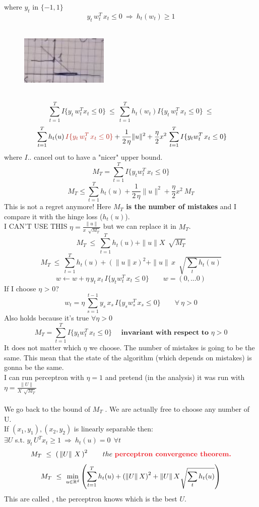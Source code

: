 \documentclass[../main.tex]{subfiles}
\begin{document}
where $y_t$ in $\{ -1,1\}$
$$
y_t \, w_t^T \, x_t \leq 0 \ \Rightarrow \ h_t(w_t) \geq 1
$$
\\
\begin{figure}[h]
    \centering
    \includegraphics[width=0.4\linewidth]{../img/lez16-img3.JPG}
    \caption{}
\end{figure}\\
$$
\sum_{t=1}^T I \{y_t \, w_t^T x_t \leq 0  \} \ \leq \ \sum_{t=1}^T h_t(w_t) I \{y_t \, w_t^T \, x_t \leq 0 \} \ \leq 
$$
$$
\ \sum_{t=1}^T h_t(u ) \, \red{I \{ y_t \, w_t^T \, x_t \leq 0 \}} + \frac{1}{2 \, \eta} \| u \|^2 + \frac{\eta}{2} x^2 \, \sum_{t=1}^T I\{y_t w_t^T \, x_t \leq 0 \}
$$
where $I{..}$ cancel out to have a "nicer" upper bound.
$$
M_T = \sum_{t=1}^T  I\{y_t w_t^T \, x_t \leq 0 \}
$$
$$
M_T \leq \sum_{t=1}^T h_t(u) + \frac{1}{2 \, \eta} \|u \|^2 + \frac{\eta}{2} x^2 \ M_T
$$
This is not a regret anymore! Here \textbf{$M_T$ is the number of mistakes} and I compare it with the hinge loss ($h_t(u)$).
\\
I CAN'T USE THIS $\eta = \frac{\|u\|}{x \, \sqrt[]{M_T}}$
but we can replace it in $M_T$.
\\
$$
M_T \ \leq \ \sum_{t=1}^T h_t(u) + \|u\| X \, \sqrt[]{M_T}
$$
$$
M_T \ \leq \ \sum_{t=1}^T h_t(u) + (\| u\| x)^2 + \| u\| \, x \ \sqrt[]{\sum_t h_t(u)}
$$
$$
w \leftarrow w + \eta \, y_t \, x_t \, I\{y_t w_t^T \, x_t \leq 0 \} \qquad w = (0,...0)
$$
If I choose $\eta$ > 0?
$$
w_t = \eta \, \sum_{s=1}^{t-1} y_s \, x_s \, I\{y_s w_s^T \, x_s \leq 0 \} \qquad \forall \ \eta > 0
$$
Also holds because it's true $ \forall \eta > 0$
$$
M_T = \sum_{t=1}^T I\{y_t w_t^T \, x_t \leq 0 \} \quad \textbf{ invariant with respect to $\eta >0$}
$$
It does not matter which $\eta$ we choose. The number of mistakes is going to be the same. This mean that the state of the algorithm (which depends on mistakes) is gonna be the same.
\\
I can run perceptron with $\eta = 1$ and pretend (in the analysis) it was run with $\eta = \frac{\| U \|}{X \, \sqrt[]{M_T}}$
\\\\
We go back to the bound of $M_T$ . We are actually free to choose any number of U.
\\
If $(x_1, y_1),(x_2,y_2) $ is linearly separable then: \\ $\exists U$ s.t. $y_t \, U^T x_t \geq 1 \ \Rightarrow \ h_t(u) = 0 \ \ \forall t $
\\
$$M_T \ \leq \ \left( \, \| U\| \ X \, \right)^2  \qquad the \ \bred{perceptron convergence theorem.} $$
$$
M_T \ \leq \ \min_{u \in \mathbb{R}^d} \left( \sum_{t=1}^T h_t(u) + \left( \|U\| \, X \right)^2 + \| U \| \, X \ \sqrt[]{\sum_t h_t(u)} \right)
$$
This are called , the perceptron knows which is the best $U$.
\newpage
\end{document}
